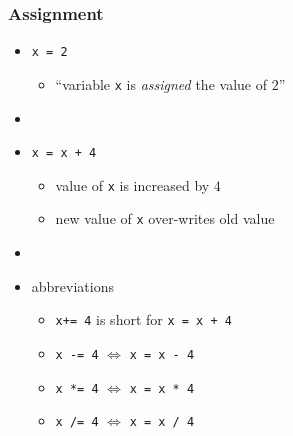 \documentclass[14pt]{beamer}
\newcommand\red[1]{{\color{red} #1}}
\begin{document}
\begin{frame}[fragile]

\frametitle{Assignment}

\begin{itemize}
	\item \texttt{x = 2}
	\begin{itemize}
		\item ``variable \texttt{x} is \red{\emph{assigned}} the value of $2$''
	\end{itemize}
	\item[]
	\item \texttt{x = x + 4}
	\begin{itemize}
		\item value of \texttt{x} is increased by $4$
		\item new value of \texttt{x} over-writes old value
	\end{itemize}
	\item[]
	\item abbreviations
		\begin{itemize}
		\item \texttt{x+= 4} is short for \texttt{x = x + 4}
		\item \texttt{x -= 4} $\Longleftrightarrow$  \texttt{x = x - 4}
		\item \texttt{x *= 4} $\Longleftrightarrow$ \texttt{x = x * 4}
		\item \texttt{x /= 4} $\Longleftrightarrow$ \texttt{x = x / 4}
	\end{itemize}

\end{itemize}

\end{frame}

\end{document}
